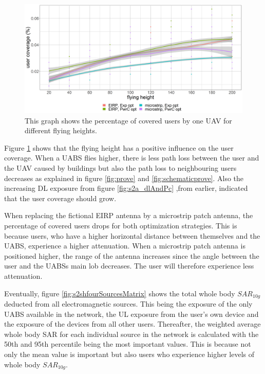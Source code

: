 \begin{figure}[h]
  \includegraphics[width=\textwidth]{../results/s2/fhvscov.png}
  \caption{This graph shows the percentage of covered users by one \gls{UAV} for different flying heights.}
  \label{fig:s2fhvscov}
\end{figure}

Figure  \ref{fig:s2fhvscov} shows that the flying height has a positive influence on the user coverage. 
When a \gls{UABS} flies higher, there is less path loss between the user and the \gls{UAV} caused by buildings but also the path loss to neighbouring 
users decreases as explained 
in figure \ref{fig:prove} and \ref{fig:schematicprove}. 
Also the increasing \gls{DL} exposure  from figure \ref{fig:s2a_dlAndPc} ,from earlier, indicated that the
user coverage should grow.

When replacing the fictional \gls{EIRP} antenna by a microstrip patch antenna, the percentage of covered users drops for both 
optimization strategies. This is because users, who have a higher horizontal distance between themselves and the \gls{UABS}, 
experience a higher attenuation. When a microstrip patch antenna is positioned higher, the range of the antenna increases 
since the angle between the user and the \gls{UABS}s main lob decreases. The user will therefore experience less attenuation.

Eventually, figure \ref{fig:s2shfourSourcesMatrix} shows the total whole body $SAR_{10g}$ deducted from all electromagnetic sources. This being the exposure 
of the only \gls{UABS} available in the network, 
 the \gls{UL} exposure from the user’s own device and the exposure of the devices from all other users. 
 Thereafter, the weighted average whole body \gls{SAR} for each individual source in the network is calculated with the 50th and 95th percentile 
 being the most important values. This is because not only the mean value is important but also users who experience higher 
 levels of whole body $SAR_{10g}$.

